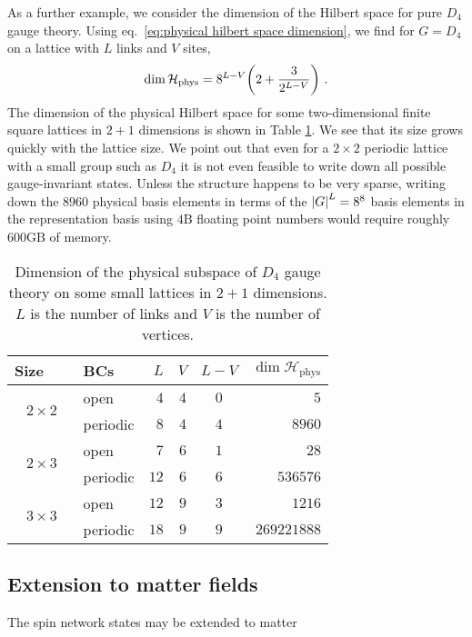 As a further example, we consider the dimension of the Hilbert space for pure $D_4$ gauge theory.
Using eq.~\eqref{eq:physical hilbert space dimension}, we find for $G=D_4$ on a lattice with $L$ links and $V$ sites,
\begin{equation}
    \dim{\mathcal{H}_{\mathrm{phys}}} = 8^{L-V}\pqty{2+\frac{3}{2^{L-V}}} \ .
\end{equation}
The dimension of the physical Hilbert space for some two-dimensional finite square lattices in $2+1$ dimensions is shown in Table \ref{tab:numstates}.
We see that its size grows quickly with the lattice size.
We point out that even for a $2 \times 2$ periodic lattice with a small group such as $D_4$ it is not even feasible to write down all possible gauge-invariant states.
Unless the structure happens to be very sparse, writing down the $8960$ physical basis elements in terms of the $\abs{G}^L = 8^8$ basis elements in the representation basis using $4 \mathrm{B}$ floating point numbers would require roughly $600 \mathrm{GB}$ of memory.
\begin{table}[t]
    \centering
    \begin{tabular}{clrrcr}
        \toprule
        Size~~~ & BCs & $L$ & $V$ & $L-V$ &$\dim{\mathcal{H}_{\mathrm{phys}}}$\\
        \midrule
        \multirow{2}{3em}{$2 \times 2$}
            & open & $4$ & $4$ & $0$ & $5$\\
            & periodic & $8$ & $4$ & $4$ & $8960$ \\[5pt]
        \multirow{2}{3em}{$2 \times 3$}
            & open & $7$ & $6$ & $1$ & $28$ \\
            & periodic & $12$ & $6$ & $6$ & $536576$ \\[5pt]
        \multirow{2}{3em}{$3 \times 3$}
            & open & $12$ & $9$ & $3$ & $1216$ \\
            & periodic & $18$ & $9$ & $9$ & $269221888$ \\
        \bottomrule
    \end{tabular}
    \caption{Dimension of the physical subspace of $D_4$ gauge theory on some small lattices in $2+1$ dimensions.
$L$ is the number of links and $V$ is the number of vertices.}
    \label{tab:numstates}
\end{table}

\subsection{Extension to matter fields} \label{sec:spin networks matter}

The spin network states may be extended to matter
